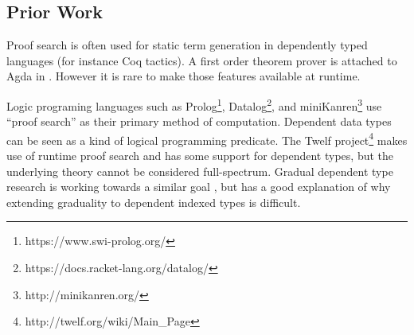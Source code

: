 \subsection{Prior Work}

Proof search is often used for static term generation in dependently typed languages (for instance Coq tactics).
A first order theorem prover is attached to Agda in \cite{norell2007towards}.
However it is rare to make those features available at runtime. 

Logic programing languages such as Prolog\footnote{https://www.swi-prolog.org/}, Datalog\footnote{https://docs.racket-lang.org/datalog/}, and miniKanren\footnote{http://minikanren.org/} use ``proof search'' as their primary method of computation.
Dependent data types can be seen as a kind of logical programming predicate.
The Twelf project\footnote{http://twelf.org/wiki/Main\_Page} makes use of runtime proof search and has some support for dependent types, but the underlying theory cannot be considered full-spectrum.
Gradual dependent type research is working towards a similar goal \cite{DBLP:journals/corr/abs-1906-06469}, but \cite{bertrand:hal-02896776} has a good explanation of why extending graduality to dependent indexed types is difficult.

